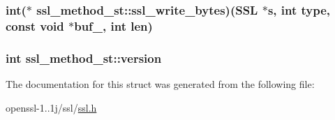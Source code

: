 \hypertarget{structssl__method__st_afe0ec27b4cecc8692e915dfe403e70a4}{
\subsubsection[{ssl\-\_\-write\-\_\-bytes}]{\setlength{\rightskip}{0pt plus 5cm}int($\ast$ ssl\-\_\-method\-\_\-st\-::ssl\-\_\-write\-\_\-bytes)(S\-S\-L $\ast$s, int type, const void $\ast$buf\-\_\-, int len)}}\label{structssl__method__st_afe0ec27b4cecc8692e915dfe403e70a4}
\hypertarget{structssl__method__st_a1d231051899c943c03267d9ede6d2488}{
\subsubsection[{version}]{\setlength{\rightskip}{0pt plus 5cm}int ssl\-\_\-method\-\_\-st\-::version}}\label{structssl__method__st_a1d231051899c943c03267d9ede6d2488}


The documentation for this struct was generated from the following file\-:\begin{DoxyCompactItemize}
\item 
openssl-\/1..\-1j/ssl/\hyperlink{ssl_8h}{ssl.\-h}\end{DoxyCompactItemize}

